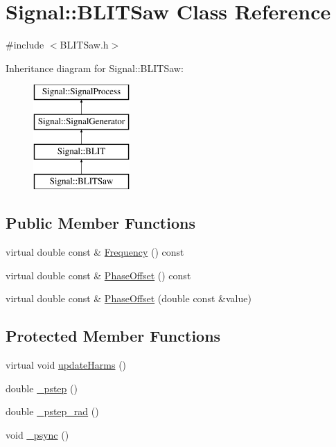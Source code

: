 \hypertarget{class_signal_1_1_b_l_i_t_saw}{\section{Signal\+:\+:B\+L\+I\+T\+Saw Class Reference}
\label{class_signal_1_1_b_l_i_t_saw}
}


{\ttfamily \#include $<$B\+L\+I\+T\+Saw.\+h$>$}

Inheritance diagram for Signal\+:\+:B\+L\+I\+T\+Saw\+:\begin{figure}[H]
\begin{center}
\leavevmode
\includegraphics[height=4.000000cm]{class_signal_1_1_b_l_i_t_saw}
\end{center}
\end{figure}
\subsection*{Public Member Functions}
\begin{DoxyCompactItemize}
\item 
virtual double const \& \hyperlink{class_signal_1_1_signal_generator_a96af42ee68f94e9b04d034fd68b73ecd}{Frequency} () const 
\item 
virtual double const \& \hyperlink{class_signal_1_1_signal_generator_ac2538ec946f001e394d2416fda698d1c}{Phase\+Offset} () const 
\item 
virtual double const \& \hyperlink{class_signal_1_1_signal_generator_ac6a103ff72beaa338f6d18c812522d78}{Phase\+Offset} (double const \&value)
\end{DoxyCompactItemize}
\subsection*{Protected Member Functions}
\begin{DoxyCompactItemize}
\item 
virtual void \hyperlink{class_signal_1_1_b_l_i_t_saw_ac2dd5e8cbd1797fe62aa0947e1fd1b9f}{update\+Harms} ()
\item 
double \hyperlink{class_signal_1_1_b_l_i_t_a5ef180600362d9cee13f7ffe91cc5110}{\+\_\+pstep} ()
\item 
double \hyperlink{class_signal_1_1_b_l_i_t_af0396c77f48507e2447ad7614d71ced2}{\+\_\+pstep\+\_\+rad} ()
\item 
void \hyperlink{class_signal_1_1_b_l_i_t_a429c0d14e7391341ac5d3ca989a937f8}{\+\_\+psync} ()
\end{DoxyCompactItemize}
